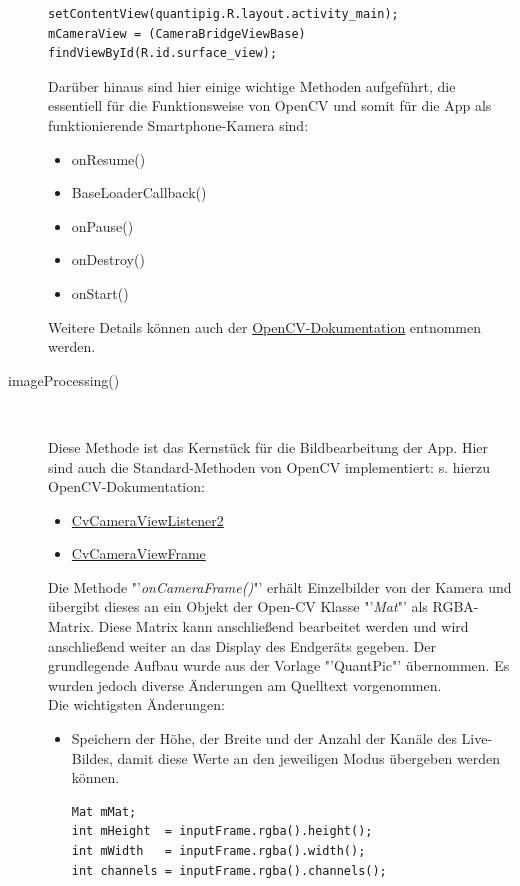 \begin{description}
\lstset{language = JAVA}

\begin{lstlisting}
setContentView(quantipig.R.layout.activity_main);
mCameraView = (CameraBridgeViewBase) findViewById(R.id.surface_view);
\end{lstlisting}

Darüber hinaus sind hier einige wichtige Methoden aufgeführt, die essentiell für die Funktionsweise von OpenCV und somit für die App als funktionierende Smartphone-Kamera sind:
\begin{itemize}
\item onResume()
\item BaseLoaderCallback()
\item onPause()
\item onDestroy()
\item onStart()
\end{itemize}
Weitere Details können auch der \href{http://docs.opencv.org/2.4/doc/tutorials/introduction/android_binary_package/dev_with_OCV_on_Android.html#dev-with-ocv-on-android}{OpenCV-Dokumentation} entnommen werden.

\item[imageProcessing()]~\par
\label{imageProcessing}

Diese Methode ist das Kernstück für die Bildbearbeitung der App. 
Hier sind auch die Standard-Methoden von OpenCV implementiert:
s. hierzu OpenCV-Dokumentation:
\begin{itemize}
\item \href{http://docs.opencv.org/java/2.4.9/org/opencv/android/CameraBridgeViewBase.CvCameraViewListener2.html}{CvCameraViewListener2}
\item \href{http://docs.opencv.org/java/2.4.9/org/opencv/android/CameraBridgeViewBase.CvCameraViewFrame.html}{CvCameraViewFrame}
\end{itemize}
 Die Methode "'\textit{onCameraFrame()}"' erhält Einzelbilder von der Kamera und übergibt dieses an ein Objekt der Open-CV Klasse "'\textit{Mat}"' als RGBA-Matrix. Diese Matrix kann anschließend bearbeitet werden und wird anschließend weiter an das Display des Endgeräts gegeben. Der grundlegende Aufbau wurde aus der Vorlage "'QuantPic"' übernommen. Es wurden jedoch diverse Änderungen am Quelltext vorgenommen.\\ 
Die wichtigsten Änderungen:
\begin{itemize}
\item Speichern der Höhe, der Breite und der Anzahl der Kanäle des Live-Bildes, damit diese Werte an den jeweiligen Modus übergeben werden können.
\begin{lstlisting}
Mat mMat;
int mHeight  = inputFrame.rgba().height();
int mWidth   = inputFrame.rgba().width();
int channels = inputFrame.rgba().channels();
\end{lstlisting}


\end{itemize}
\end{description}
